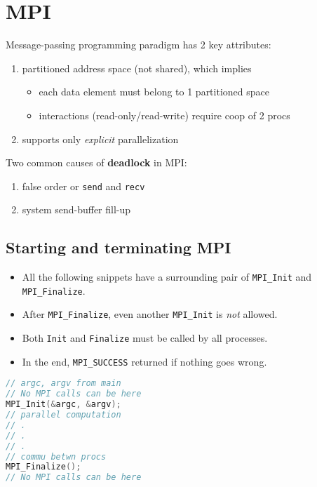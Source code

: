 \section*{MPI}
Message-passing programming paradigm has 2 key attributes:
\begin{enumerate}
\item partitioned address space (not shared), which implies
  \begin{itemize}
  \item each data element must belong to 1 partitioned space
  \item interactions (read-only/read-write) require coop of 2 procs
  \end{itemize}
\item supports only \emph{explicit} parallelization
\end{enumerate}
Two common causes of \textbf{deadlock} in MPI:
\begin{enumerate}
\item false order or \texttt{send} and \texttt{recv}
\item system send-buffer fill-up
\end{enumerate}

\subsection*{Starting and terminating MPI}
\begin{minipage}{0.5\linewidth}
  \begin{itemize}
  \item All the following snippets have a surrounding pair of \texttt{MPI\_Init} and \texttt{MPI\_Finalize}.
  \item After \texttt{MPI\_Finalize}, even another \texttt{MPI\_Init} is \emph{not} allowed.
  \item Both \texttt{Init} and \texttt{Finalize} must be called by all processes.
  \item In the end, \texttt{MPI\_SUCCESS} returned if nothing goes wrong.
  \end{itemize}
\end{minipage}
\begin{minipage}{0.48\linewidth}
\begin{lstlisting}[language=c,xleftmargin=1pt]
// argc, argv from main
// No MPI calls can be here
MPI_Init(&argc, &argv);
// parallel computation
// .
// .
// .
// commu betwn procs
MPI_Finalize();
// No MPI calls can be here
\end{lstlisting}
\end{minipage}

